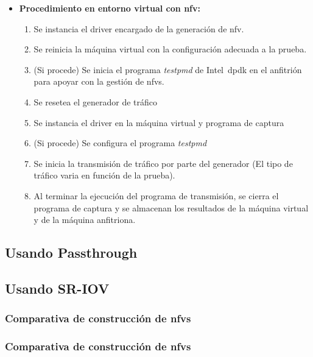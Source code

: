 \begin{itemize}
\item \textbf{Procedimiento en entorno virtual con \gls{nfv}:}
\begin{enumerate}
\item Se instancia el driver encargado de la generación de \gls{nfv}.
\item Se reinicia la máquina virtual con la configuración adecuada a la prueba.
\item (Si procede) Se inicia el programa \textit{testpmd} de Intel~\gls{dpdk} en el anfitrión para apoyar con la gestión de \glspl{nfv}.
\item Se resetea el generador de tráfico
\item Se instancia el driver en la máquina virtual y programa de captura
\item (Si procede) Se configura el programa \textit{testpmd}
\item Se inicia la transmisión de tráfico por parte del generador (El tipo de tráfico varia en función de la prueba).
\item Al terminar la ejecución del programa de transmisión, se cierra el programa de captura y se almacenan los resultados de la máquina virtual y de la máquina anfitriona.
\end{enumerate}

\end{itemize}





\subsection{Usando Passthrough\label{sec:pt}}

\subsection{Usando SR-IOV\label{sec:sriov}}


\subsubsection{Comparativa de construcción de \glspl{nfv}}


\subsubsection{Comparativa de construcción de \glspl{nfv}}
